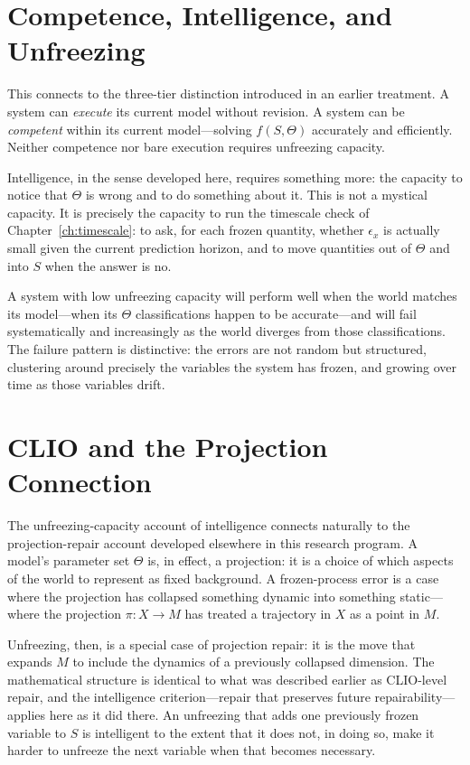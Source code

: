 \documentclass[11pt]{book}
\theoremstyle{plain}
\theoremstyle{definition}
\theoremstyle{remark}
\begin{document}
\section{Competence, Intelligence, and Unfreezing}

This connects to the three-tier distinction introduced in an earlier treatment. A system can \emph{execute} its current model without revision. A system can be \emph{competent} within its current model---solving $f(S,\Theta)$ accurately and efficiently. Neither competence nor bare execution requires unfreezing capacity.

Intelligence, in the sense developed here, requires something more: the capacity to notice that $\Theta$ is wrong and to do something about it. This is not a mystical capacity. It is precisely the capacity to run the timescale check of Chapter~\ref{ch:timescale}: to ask, for each frozen quantity, whether $\epsilon_x$ is actually small given the current prediction horizon, and to move quantities out of $\Theta$ and into $S$ when the answer is no.

A system with low unfreezing capacity will perform well when the world matches its model---when its $\Theta$ classifications happen to be accurate---and will fail systematically and increasingly as the world diverges from those classifications. The failure pattern is distinctive: the errors are not random but structured, clustering around precisely the variables the system has frozen, and growing over time as those variables drift.

\section{CLIO and the Projection Connection}

The unfreezing-capacity account of intelligence connects naturally to the projection-repair account developed elsewhere in this research program. A model's parameter set $\Theta$ is, in effect, a projection: it is a choice of which aspects of the world to represent as fixed background. A frozen-process error is a case where the projection has collapsed something dynamic into something static---where the projection $\pi : X \to M$ has treated a trajectory in $X$ as a point in $M$.

Unfreezing, then, is a special case of projection repair: it is the move that expands $M$ to include the dynamics of a previously collapsed dimension. The mathematical structure is identical to what was described earlier as CLIO-level repair, and the intelligence criterion---repair that preserves future repairability---applies here as it did there. An unfreezing that adds one previously frozen variable to $S$ is intelligent to the extent that it does not, in doing so, make it harder to unfreeze the next variable when that becomes necessary.
\end{document}
